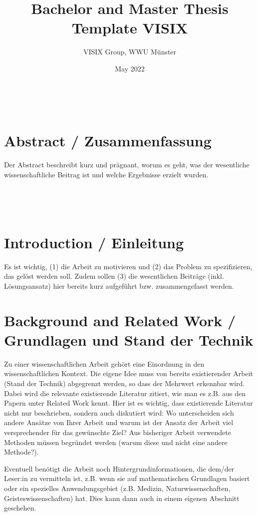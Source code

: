 \documentclass{article}
\title{Bachelor and Master Thesis Template VISIX}
\author{VISIX Group, WWU Münster }
\date{May 2022}
\begin{document}


\begin{titlepage}

\end{titlepage}

\newpage \ \newpage

\section*{Abstract / Zusammenfassung}
Der Abstract beschreibt kurz und prägnant, worum es geht, was der wesentliche wissenschaftliche Beitrag ist und welche Ergebnisse erzielt wurden.


\newpage \ \newpage

\renewcommand*\contentsname{Contents / Inhaltsverzeichnis}
\tableofcontents
\thispagestyle{empty}

\newpage \ \newpage

\setcounter{page}{1}
\section{Introduction / Einleitung}

Es ist wichtig, (1) die Arbeit zu motivieren und (2) das Problem zu spezifizieren, das gelöst werden soll.
Zudem sollen (3) die wesentlichen Beiträge (inkl. Lösungsansatz) hier bereits kurz aufgeführt bzw. zusammengefasst werden.


\section{Background and Related Work / Grundlagen und Stand der Technik} 

Zu einer wissenschaftlichen Arbeit gehört eine Einordnung in den wissenschaftlichen Kontext.
Die eigene Idee muss von bereits existierender Arbeit (Stand der Technik)  abgegrenzt werden, so dass der Mehrwert erkennbar wird. Dabei wird die relevante existierende Literatur zitiert, wie man es z.B. aus den Papern unter Related Work kennt.
Hier ist es wichtig, dass existierende Literatur nicht nur beschrieben, sondern auch diskutiert wird: Wo unterscheiden sich andere Ansätze von Ihrer Arbeit und warum ist der Ansatz der Arbeit viel versprechender für das gewünschte Ziel?
Aus bisheriger Arbeit verwendete Methoden müssen begründet werden (warum diese und nicht eine andere Methode?).

Eventuell benötigt die Arbeit noch Hintergrundinformationen, die dem/der Leser:in zu vermitteln ist, z.B. wenn sie auf mathematischen Grundlagen basiert oder ein spezielles Anwendungsgebiet (z.B. Medizin, Naturwissenschaften, Geisteswissenschaften) hat. Dies kann dann auch in einem eigenen Abschnitt geschehen.
\end{document}
